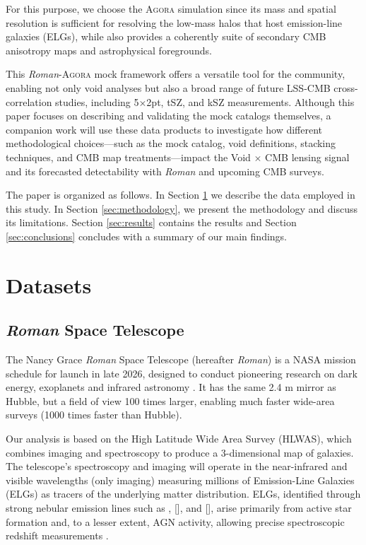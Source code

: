 \documentclass[]{aa} %
\begin{document}
For this purpose, we choose the \textsc{Agora} simulation \citep{omori2022} since its mass and spatial resolution is sufficient for resolving the low-mass halos that host emission-line galaxies (ELGs), while also provides a coherently suite of secondary CMB anisotropy maps and astrophysical foregrounds.

This \emph{Roman}-\textsc{Agora} mock framework offers a versatile tool for the community, enabling not only void analyses but also a broad range of future LSS-CMB cross-correlation studies, including 5×2pt, tSZ, and kSZ measurements. Although this paper focuses on describing and validating the mock catalogs themselves, a companion work will use these data products to investigate how different methodological choices---such as the mock catalog, void definitions, stacking techniques, and CMB map treatments---impact the Void $\times$ CMB lensing signal and its forecasted detectability with \emph{Roman} and upcoming CMB surveys.


The paper is organized as follows. In Section \ref{sec:datasets} we describe the data employed in this study. In Section \ref{sec:methodology}, we present the methodology and discuss its limitations. Section \ref{sec:results} contains the results and Section \ref{sec:conclusions} concludes with a summary of our main findings.

\section{Datasets}
\label{sec:datasets}
\subsection{\emph{Roman} Space Telescope}
The Nancy Grace \emph{Roman} Space Telescope (hereafter \emph{Roman}) is a NASA mission schedule for launch in late 2026, designed to conduct pioneering research on dark energy, exoplanets and infrared astronomy \citep{green2012wide,spergel2015wide,zasowski2025roman}. It has the same 2.4 m mirror as Hubble, but a field of view 100 times larger, enabling much faster wide-area surveys (1000 times faster than Hubble). 

Our analysis is based on the High Latitude Wide Area Survey (HLWAS), which combines imaging and spectroscopy to produce a 3-dimensional map of galaxies. The telescope's spectroscopy and imaging will operate in the near-infrared and visible wavelengths (only imaging) measuring millions of Emission-Line Galaxies (ELGs) as tracers of the underlying matter distribution. ELGs, identified through strong nebular emission lines such as , [], and [], arise primarily from active star formation and, to a lesser extent, AGN activity, allowing precise spectroscopic redshift measurements \citep{gonzalez2020}. 
\end{document}
